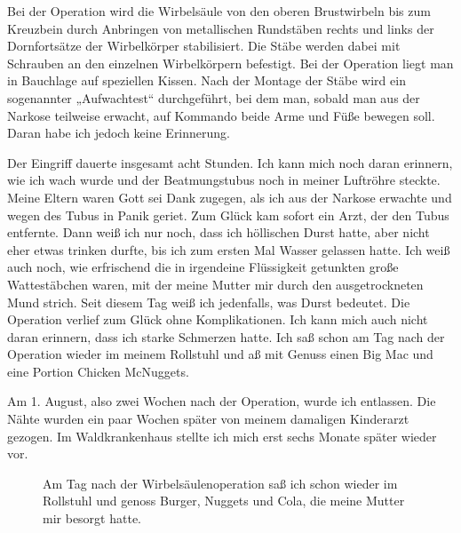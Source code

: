 \documentclass[fontsize=14pt,a4paper,headinclude,DIV=calc,automark]{scrbook}
\begin{document}
Bei der Operation wird die Wirbelsäule von den oberen Brustwirbeln bis zum Kreuzbein durch Anbringen von metallischen Rundstäben rechts und links der Dornfortsätze der Wirbelkörper stabilisiert. Die Stäbe werden dabei mit Schrauben an den einzelnen Wirbelkörpern befestigt. Bei der Operation liegt man in Bauchlage auf speziellen Kissen. Nach der Montage der Stäbe wird ein sogenannter „Aufwachtest“ durchgeführt, bei dem man, sobald man aus der Narkose teilweise erwacht, auf Kommando beide Arme und Füße bewegen soll. Daran habe ich jedoch keine Erinnerung.

Der Eingriff dauerte insgesamt acht Stunden. Ich kann mich noch daran erinnern, wie ich wach wurde und der Beatmungstubus noch in meiner Luftröhre steckte. Meine Eltern waren Gott sei Dank zugegen, als ich aus der Narkose erwachte und wegen des Tubus in Panik geriet. Zum Glück kam sofort ein Arzt, der den Tubus entfernte. Dann weiß ich nur noch, dass ich höllischen Durst hatte, aber nicht eher etwas trinken durfte, bis ich zum ersten Mal Wasser gelassen hatte. Ich weiß auch noch, wie erfrischend die in irgendeine Flüssigkeit getunkten große Wattestäbchen waren, mit der meine Mutter mir durch den ausgetrockneten Mund strich. Seit diesem Tag weiß ich jedenfalls, was Durst bedeutet.
Die Operation verlief zum Glück ohne Komplikationen. Ich kann mich auch nicht daran erinnern, dass ich starke Schmerzen hatte. Ich saß schon am Tag nach der Operation wieder im meinem Rollstuhl und aß mit Genuss einen Big Mac und eine Portion Chicken McNuggets.

Am 1. August, also zwei Wochen nach der Operation, wurde ich entlassen. Die Nähte wurden ein paar Wochen später von meinem damaligen Kinderarzt gezogen. Im Waldkrankenhaus stellte ich mich erst sechs Monate später wieder vor.

\setlength{\fboxsep}{0pt}    %
\setlength{\fboxrule}{0.2pt} %
\begin{figure}[H]
    \centering
    \caption{Am Tag nach der Wirbelsäulenoperation saß ich schon wieder im Rollstuhl und genoss Burger, Nuggets und Cola, die meine Mutter mir besorgt hatte.}
    \label{fig:mcdonalds}
\end{figure}
\end{document}
